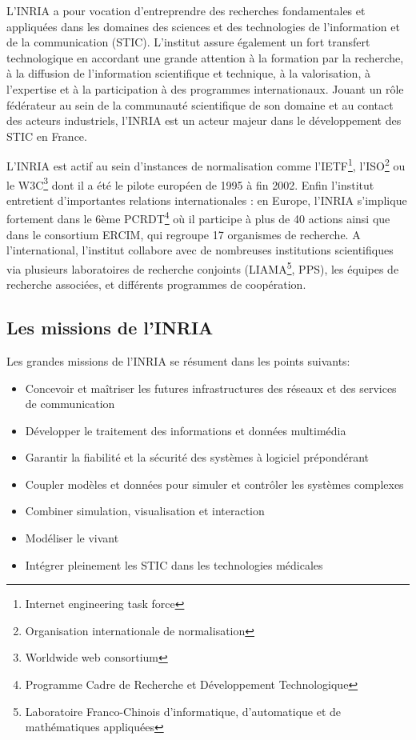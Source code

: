 \documentclass[a4paper, 11pt]{report}
\begin{document}
    L’INRIA a pour vocation d’entreprendre des recherches fondamentales et
    appliquées dans les domaines des sciences et des technologies de l’information
    et de la communication (STIC). L’institut assure également un fort
    transfert technologique en accordant une grande attention à la formation
    par la recherche, à la diffusion de l’information scientifique et
    technique, à la valorisation, à l’expertise et à la participation à des
    programmes internationaux. Jouant un rôle fédérateur au sein de la
    communauté scientifique de son domaine et au contact des acteurs
    industriels, l’INRIA est un acteur majeur dans le développement des STIC en
    France.

    L’INRIA est actif au sein d’instances de normalisation comme l’IETF\footnote{Internet engineering task force},
    l’ISO\footnote{Organisation internationale de normalisation} ou le W3C\footnote{Worldwide web consortium} dont il a été le pilote européen de 1995 à fin 2002.
    Enfin l’institut entretient d’importantes relations internationales : en
    Europe, l’INRIA s’implique fortement dans le 6ème PCRDT\footnote{Programme Cadre de Recherche et Développement Technologique} où il participe
    à plus de 40 actions ainsi que dans le consortium ERCIM, qui regroupe 17
    organismes de recherche. A l’international, l’institut collabore avec de
    nombreuses institutions scientifiques via plusieurs laboratoires de
    recherche conjoints (LIAMA\footnote{Laboratoire Franco-Chinois
    d'informatique, d'automatique et de mathématiques appliquées}, PPS), les
    équipes de recherche associées,
    et différents programmes de coopération.

    \subsection{Les missions de l'INRIA}
    Les grandes missions de l'INRIA se résument dans les points suivants:
    \begin{itemize}
     \item Concevoir et maîtriser les futures infrastructures des réseaux et
     des services de communication
     \item Développer le traitement des informations et données multimédia
     \item Garantir la fiabilité et la sécurité des systèmes à logiciel
     prépondérant
     \item Coupler modèles et données pour simuler et contrôler les systèmes
     complexes
     \item Combiner simulation, visualisation et interaction
     \item Modéliser le vivant
     \item Intégrer pleinement les STIC dans les technologies médicales
    \end{itemize}
\end{document}
